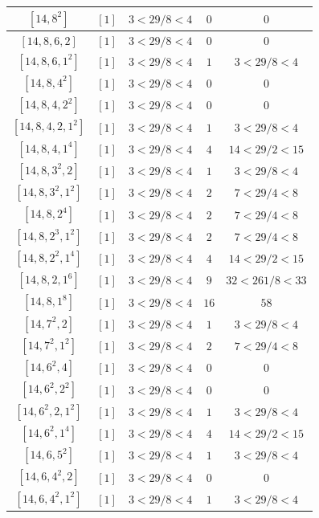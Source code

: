 \documentclass{article}%
\begin{document}
\begin{center}
\begin{longtable}{||c|c|c|c|c||}
$[14, 8^{2}]$ & $[1]$ & $3 < 29/8 < 4$ & $0$ & $0$ \\ \hline 
$[14, 8, 6, 2]$ & $[1]$ & $3 < 29/8 < 4$ & $0$ & $0$ \\ \hline 
$[14, 8, 6, 1^{2}]$ & $[1]$ & $3 < 29/8 < 4$ & $1$ & $3 < 29/8 < 4$ \\ \hline 
$[14, 8, 4^{2}]$ & $[1]$ & $3 < 29/8 < 4$ & $0$ & $0$ \\ \hline 
$[14, 8, 4, 2^{2}]$ & $[1]$ & $3 < 29/8 < 4$ & $0$ & $0$ \\ \hline 
$[14, 8, 4, 2, 1^{2}]$ & $[1]$ & $3 < 29/8 < 4$ & $1$ & $3 < 29/8 < 4$ \\ \hline 
$[14, 8, 4, 1^{4}]$ & $[1]$ & $3 < 29/8 < 4$ & $4$ & $14 < 29/2 < 15$ \\ \hline 
$[14, 8, 3^{2}, 2]$ & $[1]$ & $3 < 29/8 < 4$ & $1$ & $3 < 29/8 < 4$ \\ \hline 
$[14, 8, 3^{2}, 1^{2}]$ & $[1]$ & $3 < 29/8 < 4$ & $2$ & $7 < 29/4 < 8$ \\ \hline 
$[14, 8, 2^{4}]$ & $[1]$ & $3 < 29/8 < 4$ & $2$ & $7 < 29/4 < 8$ \\ \hline 
$[14, 8, 2^{3}, 1^{2}]$ & $[1]$ & $3 < 29/8 < 4$ & $2$ & $7 < 29/4 < 8$ \\ \hline 
$[14, 8, 2^{2}, 1^{4}]$ & $[1]$ & $3 < 29/8 < 4$ & $4$ & $14 < 29/2 < 15$ \\ \hline 
$[14, 8, 2, 1^{6}]$ & $[1]$ & $3 < 29/8 < 4$ & $9$ & $32 < 261/8 < 33$ \\ \hline 
$[14, 8, 1^{8}]$ & $[1]$ & $3 < 29/8 < 4$ & $16$ & $58$ \\ \hline 
$[14, 7^{2}, 2]$ & $[1]$ & $3 < 29/8 < 4$ & $1$ & $3 < 29/8 < 4$ \\ \hline 
$[14, 7^{2}, 1^{2}]$ & $[1]$ & $3 < 29/8 < 4$ & $2$ & $7 < 29/4 < 8$ \\ \hline 
$[14, 6^{2}, 4]$ & $[1]$ & $3 < 29/8 < 4$ & $0$ & $0$ \\ \hline 
$[14, 6^{2}, 2^{2}]$ & $[1]$ & $3 < 29/8 < 4$ & $0$ & $0$ \\ \hline 
$[14, 6^{2}, 2, 1^{2}]$ & $[1]$ & $3 < 29/8 < 4$ & $1$ & $3 < 29/8 < 4$ \\ \hline 
$[14, 6^{2}, 1^{4}]$ & $[1]$ & $3 < 29/8 < 4$ & $4$ & $14 < 29/2 < 15$ \\ \hline 
$[14, 6, 5^{2}]$ & $[1]$ & $3 < 29/8 < 4$ & $1$ & $3 < 29/8 < 4$ \\ \hline 
$[14, 6, 4^{2}, 2]$ & $[1]$ & $3 < 29/8 < 4$ & $0$ & $0$ \\ \hline 
$[14, 6, 4^{2}, 1^{2}]$ & $[1]$ & $3 < 29/8 < 4$ & $1$ & $3 < 29/8 < 4$ \\ \hline 

\end{longtable}
\end{center}
\end{document}
